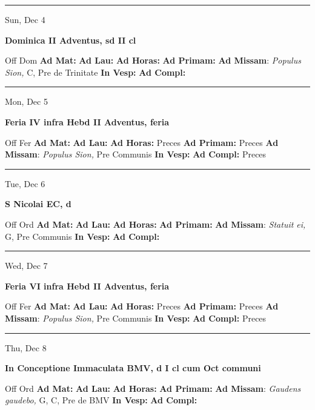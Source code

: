 \documentclass[letterpaper, 10pt]{article}
\begin{document}
\hrule
\begin{center}
Sun, Dec 4
\end{center}\textbf{ \large Dominica II Adventus, \textnormal{\normalsize sd II cl}}
\begin{justify}
Off Dom
\textbf{Ad Mat: }
\textbf{Ad Lau: }
\textbf{Ad Horas: }
\textbf{Ad Primam: }
\textbf{Ad Missam}: \textit{Populus Sion,} C, Pre de Trinitate
\textbf{In Vesp: }
\textbf{Ad Compl: }\end{justify}



\hrule
\begin{center}
Mon, Dec 5
\end{center}\textbf{ \large Feria IV infra Hebd II Adventus, \textnormal{\normalsize feria}}
\begin{justify}
Off Fer
\textbf{Ad Mat: }
\textbf{Ad Lau: }
\textbf{Ad Horas: }Preces
\textbf{Ad Primam: }Preces
\textbf{Ad Missam}: \textit{Populus Sion,} Pre Communis
\textbf{In Vesp: }
\textbf{Ad Compl: }Preces\end{justify}



\hrule
\begin{center}
Tue, Dec 6
\end{center}\textbf{ \large S Nicolai EC, \textnormal{\normalsize d}}
\begin{justify}
Off Ord
\textbf{Ad Mat: }
\textbf{Ad Lau: }
\textbf{Ad Horas: }
\textbf{Ad Primam: }
\textbf{Ad Missam}: \textit{Statuit ei,} G, Pre Communis
\textbf{In Vesp: }
\textbf{Ad Compl: }\end{justify}



\hrule
\begin{center}
Wed, Dec 7
\end{center}\textbf{ \large Feria VI infra Hebd II Adventus, \textnormal{\normalsize feria}}
\begin{justify}
Off Fer
\textbf{Ad Mat: }
\textbf{Ad Lau: }
\textbf{Ad Horas: }Preces
\textbf{Ad Primam: }Preces
\textbf{Ad Missam}: \textit{Populus Sion,} Pre Communis
\textbf{In Vesp: }
\textbf{Ad Compl: }Preces\end{justify}



\hrule
\begin{center}
Thu, Dec 8
\end{center}\textbf{ \large In Conceptione Immaculata BMV, \textnormal{\normalsize d I cl cum Oct communi}}
\begin{justify}
Off Ord
\textbf{Ad Mat: }
\textbf{Ad Lau: }
\textbf{Ad Horas: }
\textbf{Ad Primam: }
\textbf{Ad Missam}: \textit{Gaudens gaudebo,} G, C, Pre de BMV
\textbf{In Vesp: }
\textbf{Ad Compl: }\end{justify}
\end{document}
